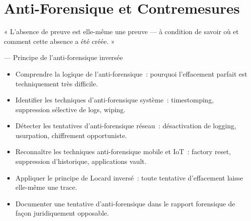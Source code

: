 
\chapter{Anti-Forensique et Contremesures}
\label{chap:anti-for}

\epigraph{%
    « L'absence de preuve est elle-même une preuve --- à condition
    de savoir où et comment cette absence a été créée. »%
}{--- Principe de l'anti-forensique inversée}


\begin{boxobjectifs}
\begin{itemize}
    \item Comprendre la logique de l'anti-forensique~: pourquoi
          l'effacement parfait est techniquement très difficile.
    \item Identifier les techniques d'anti-forensique système~:
          timestomping, suppression sélective de logs, wiping.
    \item Détecter les tentatives d'anti-forensique réseau~:
          désactivation de logging, usurpation, chiffrement opportuniste.
    \item Reconnaître les techniques anti-forensique mobile et IoT~:
          factory reset, suppression d'historique, applications vault.
    \item Appliquer le principe de Locard inversé~: toute tentative
          d'effacement laisse elle-même une trace.
    \item Documenter une tentative d'anti-forensique dans le rapport
          forensique de façon juridiquement opposable.
\end{itemize}
\end{boxobjectifs}


